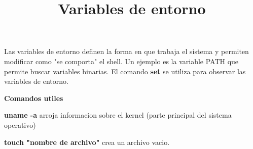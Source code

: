 \documentclass[letter paper, 12pt, oneside]{article}
\begin{document}
 \newpage
 \title{\huge\textbf{Variables de entorno}}
 
 Las variables de entorno definen la forma en que trabaja el sistema y permiten modificar como "se comporta" el shell. Un ejemplo es la variable PATH que permite buscar variables binarias. El comando \textbf{set} se utiliza para observar las variables de entorno. 
 
\textbf{Comandos utiles}

\textbf{uname -a} arroja informacion sobre el kernel (parte principal del sistema operativo)

\textbf{touch "nombre de archivo"} crea un archivo vacio.
\end{document}
